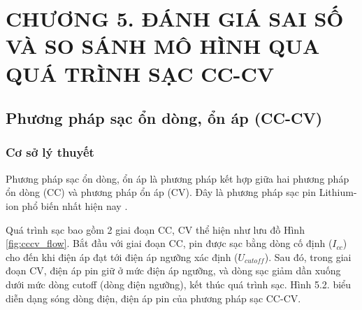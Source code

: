 \documentclass{thesis}
\begin{document}
\begin{table}[H]
    \centering
    \caption{Tham số của đa thức bậc 7 biểu diễn tụ điện và điện trở mô hình DP theo SoC}
    \label{tab:dp_poly}
\end{table}

\newpage

    \section*{CHƯƠNG 5. ĐÁNH GIÁ SAI SỐ VÀ SO SÁNH MÔ HÌNH QUA QUÁ TRÌNH SẠC CC-CV}
    \setcounter{section}{5}
    \setcounter{subsection}{0}
    \setcounter{figure}{0}
    \setcounter{table}{0}
    
    \subsection{Phương pháp sạc ổn dòng, ổn áp (CC-CV)}
    \subsubsection{Cơ sở lý thuyết}
    Phương pháp sạc ổn dòng, ổn áp là phương pháp kết hợp giữa hai phương pháp ổn dòng (CC) và phương pháp ổn áp (CV). Đây là phương pháp sạc pin Lithium-ion phổ biến nhất hiện nay \cite{shen2012}.

    Quá trình sạc bao gồm 2 giai đoạn CC, CV thể hiện như lưu đồ Hình \ref{fig:cccv_flow}. Bắt đầu với giai đoạn CC, pin được sạc bằng dòng cố định ($I_{cc}$) cho đến khi điện áp đạt tới điện áp ngưỡng xác định ($U_{cutoff}$). Sau đó, trong giai đoạn CV, điện áp pin giữ ở mức điện áp ngưỡng, và dòng sạc giảm dần xuống dưới mức dòng cutoff (dòng điện ngưỡng), kết thúc quá trình sạc. Hình 5.2. biểu diễn dạng sóng dòng điện, điện áp pin của phương pháp sạc CC-CV.
\end{document}
